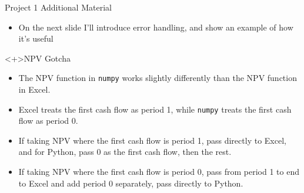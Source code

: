 \documentclass[handout, 11pt]{beamer}
\begin{document}
\begin{section}[Project 1]{Project 1 Additional Material}
\begin{frame}
\begin{itemize}
\vfill
\item On the next slide I'll introduce error handling, and show an example of how it's useful
\end{itemize}
\begin{alertblock}<+>{NPV Gotcha}
\begin{itemize}
\item The NPV function in \texttt{numpy} works slightly differently than the NPV function in Excel.
\item Excel treats the first cash flow as period 1, while \texttt{numpy} treats the first cash flow as period 0.
\item If taking NPV where the first cash flow is period 1, pass directly to Excel, and for Python, pass 0 as the first cash flow, then the rest.
\item If taking NPV where the first cash flow is period 0, pass from period 1 to end to Excel and add period 0 separately, pass directly to Python.
\end{itemize}
\end{alertblock}
\end{frame}
\end{section}
\end{document}
